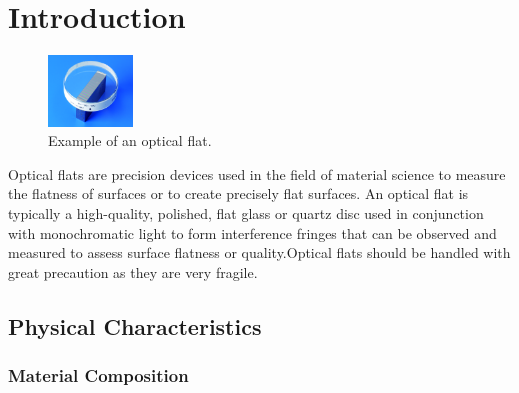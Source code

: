 \documentclass[../main.tex]{subfiles}
\begin{document}
\chapter{Introduction}

\vspace{-5pt}

\begin{minipage}{\textwidth}
\begin{figure}
    \vspace{\dimexpr0.3\baselineskip-\topskip}%
    \noindent
    \includegraphics[width=0.2\textwidth]{Images/Introduction/optical_flat}
    \vspace{-8pt}
    \caption{Example of an optical flat. \cite{optical_flat_mitutoyo}}
    \label{fig:optical_flat_example}
\end{figure}
Optical flats are precision devices used in the field of material science to measure the flatness of surfaces or to create precisely flat surfaces. An optical flat is typically a high-quality, polished, flat glass or quartz disc used in conjunction with monochromatic light to form interference fringes that can be observed and measured to assess surface flatness or quality.Optical flats should be handled with great precaution as they are very fragile. \cite{Toru_2017, edmund_optics_optical_flats, kemet_optical_flats, lapmaster_wolters_optical_flats,Paschottaoptical_flats}
\end{minipage}

\vspace{-10pt}

\section{Physical Characteristics}

\vspace{-15pt}

\subsection{Material Composition}
\end{document}
